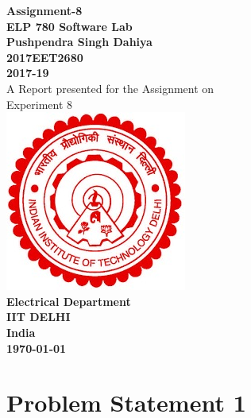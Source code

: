\documentclass[12pt]{article}
\begin{document}
\begin{titlepage}

\newcommand{\HRule}{\rule{\linewidth}{0.6mm}}

\center
 
\textbf{\Large Assignment-8}\\[1cm]
\textbf{\Large ELP 780 Software Lab}\\[0.75cm] 

\textbf{\large Pushpendra Singh Dahiya}\\[0.2cm]
\textbf{\large 2017EET2680}\\[0.2cm]
\textbf{\large 2017-19}\\[1cm]


A Report presented for the Assignment on\\[0.2cm]
Experiment 8\\[3cm]

\includegraphics[scale=.5]{iitd}\\[1cm] %
\textbf{\large{Electrical Department}}\\[0.2cm]
\textbf{\large{IIT DELHI}}\\[0.2cm]
\textbf{\large{India}}\\[0.5cm]
\textbf{\large\today}\\

\vfill

\end{titlepage}
  
\pagebreak
\tableofcontents


\newpage
\section{Problem Statement 1}
\end{document}
